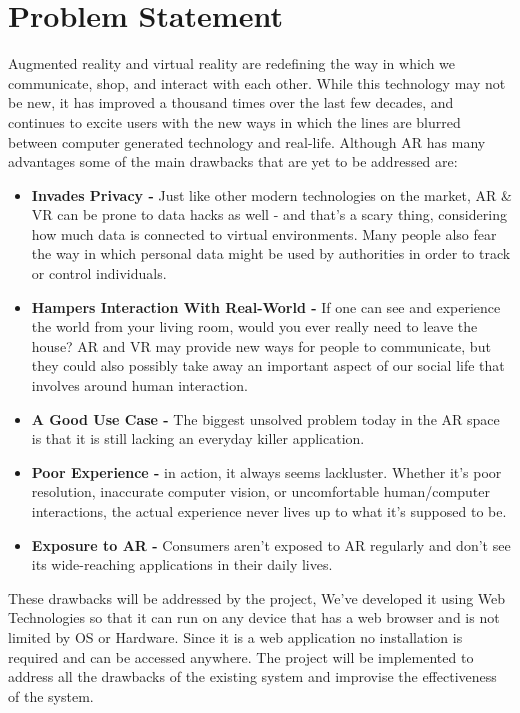 \documentclass[BTech]{srmuthesis}
\begin{document}
\section{Problem Statement}
Augmented reality and virtual reality are redefining the way in which we communicate, shop, and interact with each other. While this technology may not be new, it has improved a thousand times over the last few decades, and continues to excite users with the new ways in which the lines are blurred between computer generated technology and real-life. Although AR has many advantages some of the main drawbacks that are yet to be addressed are:
\begin{itemize}
\item \textbf{Invades Privacy -} Just like other modern technologies on the market, AR \& VR can be prone to data hacks as well - and that's a scary thing, considering how much data is connected to virtual environments. Many people also fear the way in which personal data might be used by authorities in order to track or control individuals.
\item \textbf{Hampers Interaction With Real-World -}
If one can see and experience the world from your living room, would you ever really need to leave the house? AR and VR may provide new ways for people to communicate, but they could also possibly take away an important aspect of our social life that involves around human interaction.

\item \textbf{A Good Use Case -} The biggest unsolved problem today in the AR space is that it is still lacking an everyday killer application.

\item \textbf{Poor Experience -} in action, it always seems lackluster. Whether it's poor resolution, inaccurate computer vision, or uncomfortable human/computer interactions, the actual experience never lives up to what it's supposed to be.

\item \textbf{Exposure to AR -} Consumers aren't exposed to AR regularly and don’t see its wide-reaching applications in their daily lives.

\end{itemize}
These drawbacks will be addressed by the project, We've developed
it using Web Technologies so that it can run on any device
that has a web browser and is not limited by OS or Hardware.
Since it is a web application no installation is required and
can be accessed anywhere. The project will be implemented to address all the drawbacks of the existing system and improvise the effectiveness of the system.
\end{document}
